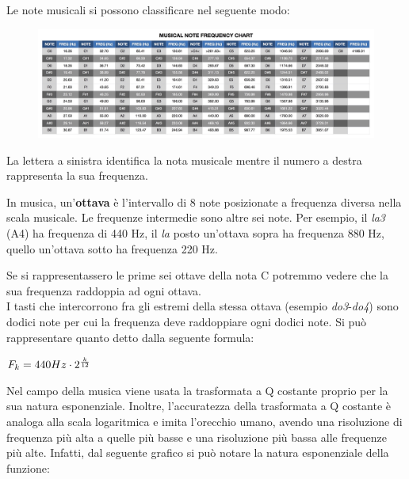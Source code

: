 Le note musicali si possono classificare nel seguente modo:
\begin{figure}[H]
	\centering
	\includegraphics[scale=0.15]{./images/img4.jpg}
\end{figure}
La lettera a sinistra identifica la nota musicale mentre il numero a destra rappresenta la sua frequenza.

In musica, un'\textbf{ottava} è l'intervallo di 8 note posizionate a frequenza diversa nella scala musicale. Le frequenze intermedie sono altre sei note. Per esempio, il \textit{la3} (A4) ha frequenza di 440 Hz, il \textit{la} posto un'ottava sopra ha frequenza 880 Hz, quello un'ottava sotto ha frequenza 220 Hz.

Se si rappresentassero le prime sei ottave della nota C potremmo vedere che la sua frequenza raddoppia ad ogni ottava. \\
\newline
I tasti che intercorrono fra gli estremi della stessa ottava (esempio \textit{do3}-\textit{do4}) sono dodici note per cui la frequenza deve raddoppiare ogni dodici note. Si può rappresentare quanto detto dalla seguente formula: \\

\begin{center}
	\begin{math}
		F_{k}=440Hz \cdot 2^{k \over 12}
	\end{math}
\end{center}
Nel campo della musica viene usata la trasformata a Q costante proprio per la sua natura esponenziale. Inoltre, l'accuratezza della trasformata a Q costante è analoga alla scala logaritmica e imita l'orecchio umano, avendo una risoluzione di frequenza più alta a quelle più basse e una risoluzione più bassa alle frequenze più alte. Infatti, dal seguente grafico si può notare la natura esponenziale della funzione:
\begin{center}
\end{center}